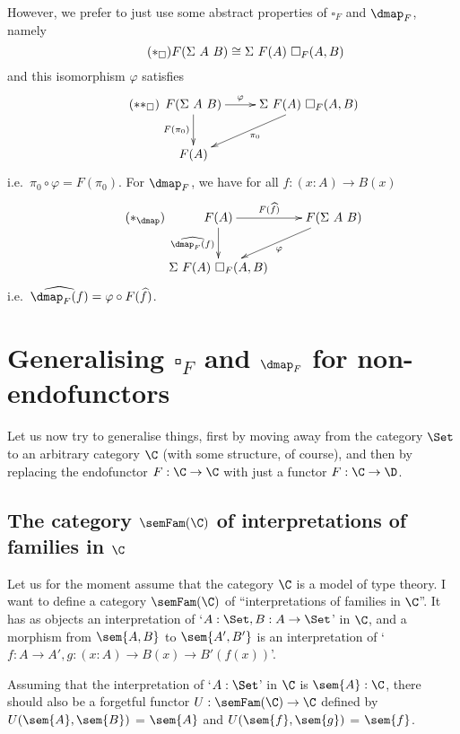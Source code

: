 \documentclass{article}
\begin{document}
However, we prefer to just use some abstract properties of $\square_F$
and $\dmap_F$, namely
\begin{equation}
  \label{eq:square}
  \tag{$\ast_{\square}$}
F (\Sigma\ A\ B) \cong \Sigma\ F(A)\ \square_F(A, B)
\end{equation}
and this isomorphism $\varphi$ satisfies
\begin{equation}
  \label{eq:square2}
  \tag{$\ast\ast_{\square}$}
\xymatrix
{
F(\Sigma\ A\ B) \ar^-{\varphi}[r] \ar_{F(\pi_0)}[d] & \Sigma\ F(A)\ \square_F(A, B) \ar^{\pi_0}[dl] \\
F(A)  & 
}
\end{equation}
i.e.\ $\pi_0 \circ \varphi = F(\pi_0)$. For $\dmap_F$, we have for all
$f : (x : A) \to B(x)$
\begin{equation}
  \label{eq:dmap}
  \tag{$\ast_{\dmap}$}
\xymatrix{
F(A) \ar^-{F(\widehat{f})}[r] \ar_{\widehat{\dmap_F(f)}}[d]& F(\Sigma\ A\ B) \ar^{\varphi}[dl] \\
\Sigma\ F(A)\ \square_F(A, B) & 
}
\end{equation}
i.e.\ $\widehat{\dmap_F(f)} = \varphi \circ F(\widehat{f})$.

\section{Generalising $\square_F$ and $\dmap_F$ for non-endofunctors}

Let us now try to generalise things, first by moving away from the
category $\Set$ to an arbitrary category $\C$ (with some
structure, of course), and then by replacing the endofunctor $F :
\C \to \C$ with just a functor $F : \C \to
\D$.

\subsection{The category $\semFam(\C)$ of interpretations
  of families in $\C$}

Let us for the moment assume that the category $\C$ is a model
of type theory. I want to define a category $\semFam(\C)$
of ``interpretations of families in $\C$''. It has as objects
an interpretation of `$A : \Set, B : A \to \Set$' in $\C$, and
a morphism from $\sem{A, B}$ to $\sem{A', B'}$ is an interpretation of
`$f : A \to A', g : (x : A) \to B(x) \to B'(f(x))$'.

Assuming that the interpretation of `$A : \Set$' in $\C$ is
$\sem{A} : \C$, there should also be a forgetful functor $U :
\semFam(\C) \to \C$ defined by $U(\sem{A},
\sem{B})$ = $\sem{A}$ and $U(\sem{f}, \sem{g})$ = $\sem{f}$.
\end{document}
